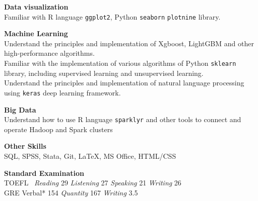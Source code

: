 \documentclass[11pt,]{article}
\begin{document}
\textbf{Data visualization}\\
Familiar with R language \texttt{ggplot2}, Python \texttt{seaborn}
\texttt{plotnine} library.

\textbf{Machine Learning}\\
Understand the principles and implementation of Xgboost, LightGBM and
other high-performance algorithms.\\
Familiar with the implementation of various algorithms of Python
\texttt{sklearn} library, including supervised learning and unsupervised
learning.\\
Understand the principles and implementation of natural language
processing using \texttt{keras} deep learning framework.

\textbf{Big Data}\\
Understand how to use R language \texttt{sparklyr} and other tools to
connect and operate Hadoop and Spark clusters

\textbf{Other Skills}\\
SQL, SPSS, Stata, Git, \LaTeX, MS Office, HTML/CSS

\textbf{Standard Examination}\\
TOEFL  ~\emph{Reading} 29 \emph{Listening} 27 \emph{Speaking}
21 \emph{Writing} 26\\
GRE \quad *Verbal* 154 \emph{Quantity} 167 \emph{Writing} 3.5
\end{document}
